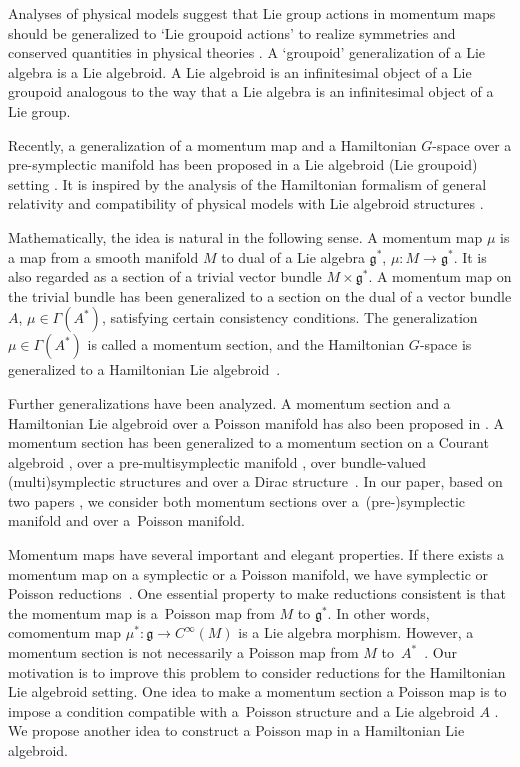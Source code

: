 \documentclass[pdftex]{sigma}
\numberwithin{equation}{section}
\begin{document}
Analyses of physical models suggest that Lie group actions in momentum maps should be generalized to `Lie groupoid actions' to realize symmetries and conserved quantities in physical theories \cite{Alekseev:2004np, Blohmann:2010jd, Cattaneo:2000iw}.
A `groupoid' generalization of a Lie algebra is a Lie algebroid.
A Lie algebroid is an infinitesimal object of a Lie groupoid analogous to the way that a Lie algebra is an infinitesimal object of a Lie group.

Recently, a generalization of a momentum map and a Hamiltonian $G$-space
over a pre-symplectic manifold
has been proposed in a Lie algebroid (Lie groupoid) setting \cite{Blohmann:2018}.
It is inspired by the analysis of the Hamiltonian formalism of general relativity \cite{Blohmann:2010jd} and compatibility of physical models with Lie algebroid structures \cite{Kotov:2016lpx}.

Mathematically, the idea is natural in the following sense. A momentum map $\mu$ is a map from a smooth manifold $M$
to dual of a Lie algebra $\mathfrak{g}^*$,
$\mu\colon M \rightarrow \mathfrak{g}^*$.
It is also regarded as a section of a trivial vector bundle $M \times \mathfrak{g}^*$.
A momentum map on the trivial bundle has been generalized
to a section on the dual of a vector bundle $A$, $\mu \in \Gamma(A^*)$,
satisfying certain consistency conditions.
The generalization $\mu \in \Gamma(A^*)$ is called a momentum section,
and the Hamiltonian $G$-space is generalized
to a Hamiltonian Lie algebroid~\cite{Blohmann:2018}.

Further generalizations have been analyzed.
A momentum section and a Hamiltonian Lie algebroid over a Poisson manifold has also been proposed in \cite{Blohmann:2023}.
A momentum section has been generalized to a momentum section on a Courant algebroid \cite{Ikeda:2021fjk}, over a pre-multisymplectic mani\-fold \cite{Hirota:2021isx}, over bundle-valued (multi)symplectic structures \cite{Hirota:2023xqd} and over a Dirac structure~\cite{Ikeda:2023pdr}.
In our paper, based on two papers \cite{Blohmann:2023,Blohmann:2018},
we consider both momentum sections over \mbox{a~(pre-)symplectic} manifold and over a~Poisson manifold.

Momentum maps have several important and elegant properties.
If there exists a momentum map on a symplectic or a Poisson manifold, we have symplectic \cite{MarsdenWeinstein, Meyer} or Poisson reductions~\cite{MarsdenRatiu}.
One essential property to make reductions consistent is that the momentum map is a~Poisson map from $M$ to $\mathfrak{g}^*$.
In other words, comomentum map $\mu^*\colon \mathfrak{g} \rightarrow C^{\infty}(M)$
is a Lie algebra morphism.
However, a momentum section is not necessarily a Poisson map from $M$ to~$A^*$~\cite{Blohmann:2023}.
Our motivation is to improve this problem to consider reductions for the Hamiltonian Lie algebroid setting.
One idea to make a momentum section a Poisson map is to impose a condition compatible with a~Poisson structure and a Lie algebroid $A$ \cite{Hirota:2023xqd}.
We propose another idea to construct a Poisson map in a Hamiltonian Lie algebroid.
\end{document}
